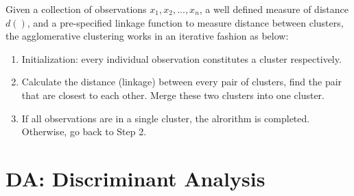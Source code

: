 \documentclass[12pt]{extarticle}
\newcommand{\<}{\langle}
\renewcommand{\>}{\rangle}
\theoremstyle{definition}
\begin{document}
Given a collection of observations $x_1,x_2,...,x_n$, a well defined measure of distance $d()$, and a pre-specified linkage function to measure distance between clusters, the agglomerative clustering works in an iterative fashion as below:\\
\begin{tcolorbox}[enhanced, drop fuzzy shadow, title=Hierarchical Clustering (agglomerative)]
\begin{enumerate}
    \item Initialization: every individual observation constitutes a cluster respectively.\\
    \item Calculate the distance (linkage) between every pair of clusters, find the pair that are closest to each other. Merge these two clusters into one cluster.\\
    \item If all observations are in a single cluster, the alrorithm is completed. Otherwise, go back to Step 2.
\end{enumerate}
\end{tcolorbox}

\newpage
\section{DA: Discriminant Analysis}
\end{document}
